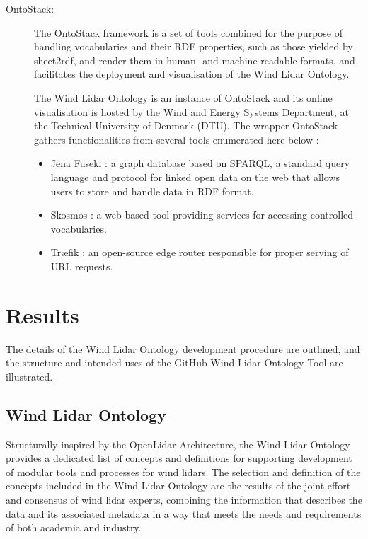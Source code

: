 \documentclass[remotesensing,article,submit,pdftex,moreauthors]{Definitions/mdpi}
\begin{document}
\begin{description}
    \item [OntoStack:] The OntoStack framework \cite{ref-OntoStack}  is a set of tools combined for the purpose of handling vocabularies and their RDF properties, such as those yielded by sheet2rdf, and render them in human- and machine-readable formats, and facilitates the deployment and visualisation of the Wind Lidar Ontology.
    
    The Wind Lidar Ontology is an instance of OntoStack and its online visualisation is hosted by the Wind and Energy Systems Department, at the Technical University of Denmark (DTU).
    The wrapper OntoStack gathers functionalities from several tools enumerated here below \cite{ref-github-sheet2rdf}:
    \begin{itemize}
        \item Jena Fuseki \cite{ref-JenaFuseki}: a graph database based on SPARQL, a standard query language and protocol for linked open data on the web \cite{ref-SPARQL} that allows users to store and handle data in RDF format.
        \item Skosmos \cite{ref-Skosmos}: a web-based tool providing services for accessing controlled vocabularies.
        \item Tr\ae fik \cite{ref-Traefik}: an open-source edge router responsible for proper serving of URL requests. 
    \end{itemize}
\end{description}


\section{Results}
\label{sec:Results}
The details of the Wind Lidar Ontology development procedure are outlined, and the structure and intended uses of the GitHub Wind Lidar Ontology Tool are illustrated.

\subsection{Wind Lidar Ontology}
Structurally inspired by the OpenLidar Architecture, the Wind Lidar Ontology provides a dedicated list of concepts and definitions for supporting development of modular tools and processes for wind lidars. The selection and definition of the concepts included in the Wind Lidar Ontology are the results of the joint effort and consensus of wind lidar experts, combining the information that describes the data and its associated metadata in a way that meets the needs and requirements of both academia and industry.
\end{document}

